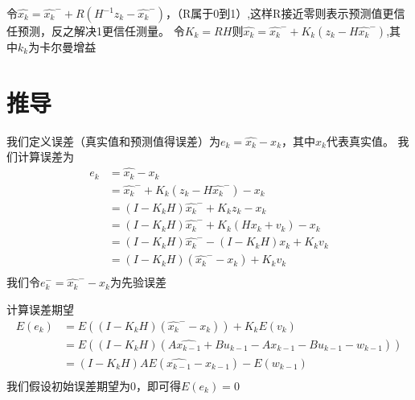 \documentclass[12pt, a4paper, oneside]{ctexbook}
\begin{document}
令$\hat{x_k} =\hat{x_k}^-+R(H^{-1}z_k-\hat{x_k}^-)$，（R属于0到1）,这样R接近零则表示预测值更信任预测，反之解决1更信任测量。
令$K_k=RH$则$\hat{x_k} =\hat{x_k}^-+K_k(z_k-H\hat{x_k}^-)$,其中$k_k$为卡尔曼增益
\section{推导}
我们定义误差（真实值和预测值得误差）为$e_k=\hat{x_k}-x_k$，其中$x_k$代表真实值。
我们计算误差为
\begin{align*}
    e_k&=\hat{x_k}-x_k\\
        &=\hat{x_k}^-+K_k(z_k-H\hat{x_k}^-)-x_k\\
        &=(I-K_kH)\hat{x_k}^-+K_kz_k-x_k\\
        &=(I-K_kH)\hat{x_k}^-+K_k(Hx_k+v_k)-x_k\\
        &=(I-K_kH)\hat{x_k}^--(I-K_kH)x_k+K_kv_k\\
        &=(I-K_kH)(\hat{x_k}^--x_k)+K_kv_k\\
\end{align*}
我们令$e_k^-=\hat{x_k}^--x_k$为先验误差

计算误差期望
\begin{align*}
    E(e_k)&=E((I-K_kH)(\hat{x_k}^--x_k))+K_kE(v_k)\\
          &=E((I-K_kH)(A\hat{x_{k-1}}+Bu_{k-1}-Ax_{k-1}-Bu_{k-1}-w_{k-1}))\\
          &=(I-K_kH)AE(\hat{x_{k-1}}-x_{k-1})-E(w_{k-1})\\
\end{align*}
我们假设初始误差期望为0，即可得$E(e_k)=0$
\end{document}
